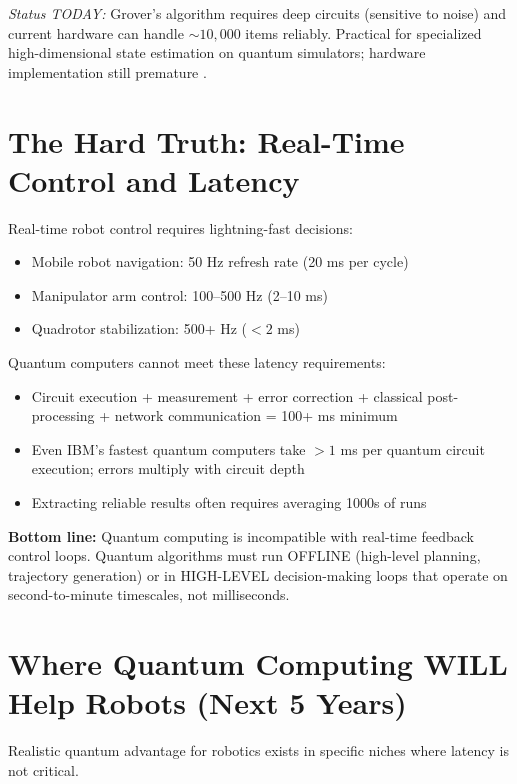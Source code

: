 \documentclass[journal]{IEEEtran}
\begin{document}
\textit{Status TODAY:} Grover's algorithm requires deep circuits (sensitive to noise) and current hardware can handle $\sim10,000$ items reliably. Practical for specialized high-dimensional state estimation on quantum simulators; hardware implementation still premature \cite{b30, b31, b32, b33}.

\section{The Hard Truth: Real-Time Control and Latency}

Real-time robot control requires lightning-fast decisions:

\begin{itemize}
\item Mobile robot navigation: 50 Hz refresh rate (20 ms per cycle) \cite{b34, b35, b36}
\item Manipulator arm control: 100--500 Hz (2--10 ms)
\item Quadrotor stabilization: 500+ Hz ($<2$ ms)
\end{itemize}

Quantum computers cannot meet these latency requirements:

\begin{itemize}
\item Circuit execution + measurement + error correction + classical post-processing + network communication = 100+ ms minimum \cite{b9, b10}
\item Even IBM's fastest quantum computers take $>1$ ms per quantum circuit execution; errors multiply with circuit depth \cite{b13, b14}
\item Extracting reliable results often requires averaging 1000s of runs
\end{itemize}

\textbf{Bottom line:} Quantum computing is incompatible with real-time feedback control loops. Quantum algorithms must run OFFLINE (high-level planning, trajectory generation) or in HIGH-LEVEL decision-making loops that operate on second-to-minute timescales, not milliseconds.

\section{Where Quantum Computing WILL Help Robots (Next 5 Years)}

Realistic quantum advantage for robotics exists in specific niches where latency is not critical.
\end{document}
